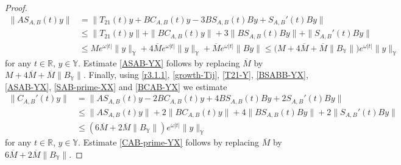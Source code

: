 \documentclass[11pt]{amsart}
\numberwithin{equation}{section}
\newcommand{\SAB}{S_{A,B}}
\newcommand{\CAB}{C_{A,B}}
\theoremstyle{remark}
\theoremstyle{definition}
\newcommand\bY{{\mathbb Y}}
\begin{document}
\begin{proof}
	\begin{align}\label{4.5.5}
		\|A\SAB(t)y\|&=\|T_{21}(t)y+B\CAB(t)y-3B\SAB(t)By+\SAB'(t)By\|\nonumber\\
		&\leq\|T_{21}(t)y\|+\|B\CAB(t)y\|+3\|B\SAB(t)By\|+\|\SAB'(t)By\|\nonumber\\
		&\leq Me^{\omega|t|}\|y\|_\bY+ 4\overline{M}e^{\omega|t|}\|y\|_\bY+\overline{M}e^{\omega|t|}\|By\|\leq \big(M+4\overline{M}+\overline{M}\|B_\bY\|\big)e^{\omega|t|}\|y\|_\bY
	\end{align}
	for any $t \in \mathbb{R}$, $y \in \bY$. Estimate \eqref{ASAB-YX} follows by replacing $\overline{M}$ by $M+4\overline{M}+\overline{M}\|B_\bY\|$. Finally, using \eqref{r3.1.1}, \eqref{growth-Tij}, \eqref{T21-Y}, \eqref{BSABB-YX}, \eqref{ASAB-YX}, \eqref{SAB-prime-XX} and \eqref{BCAB-YX} we estimate
	\begin{align}\label{4.5.6}
		\|\CAB'(t)y\|&=\|A\SAB(t)y-2B\CAB(t)y+4B\SAB(t)By+2\SAB'(t)By\|\nonumber\\&\leq\|A\SAB(t)y\|+2\|B\CAB(t)y\|+4\|B\SAB(t)By\|+2\|\SAB'(t)By\|\nonumber\\&\leq (6\overline{M}+2\overline{M}\|B_\bY\|)e^{\omega|t|}\|y\|_\bY
	\end{align}
	for any $t \in \mathbb{R}$, $y \in \bY$. Estimate \eqref{CAB-prime-YX} follows by replacing $\overline{M}$ by $6\overline{M}+2\overline{M}\|B_\bY\|$.
	

\end{proof}
\end{document}
